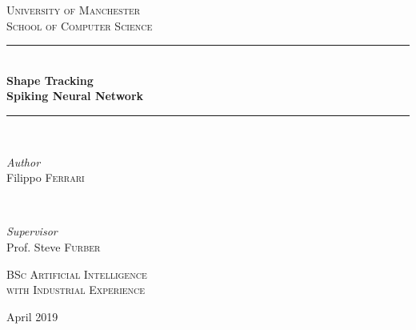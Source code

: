 \begin{titlepage}
	\newcommand{\HRule}{\rule{\linewidth}{0.5mm}} %
	
	\center %
	
	
	\textsc{\LARGE University of Manchester}\\[1cm] %
	
	\textsc{\Large School of Computer Science}\\[1.5cm] %
	
	
	
	\HRule\\[0.4cm]
	
	{\huge\bfseries Shape Tracking\\
	Spiking Neural Network}\\[0.4cm] %
	
	\HRule\\[2.0cm]
	
	
	\begin{minipage}{0.4\textwidth}
		\begin{flushleft}
			\large
			\textit{Author}\\
			Filippo \textsc{Ferrari} %
		\end{flushleft}
	\end{minipage}
	~
	\begin{minipage}{0.4\textwidth}
		\begin{flushright}
			\large
			\textit{Supervisor}\\
			Prof. Steve \textsc{Furber} %
		\end{flushright}
	\end{minipage}
	
    \vfill\vfill
    
	\textsc{\large BSc Artificial Intelligence\\
	with Industrial Experience}\\[0.5cm] %

	
	\vfill\vfill\vfill %
	
	{\large April 2019} %

\end{titlepage}